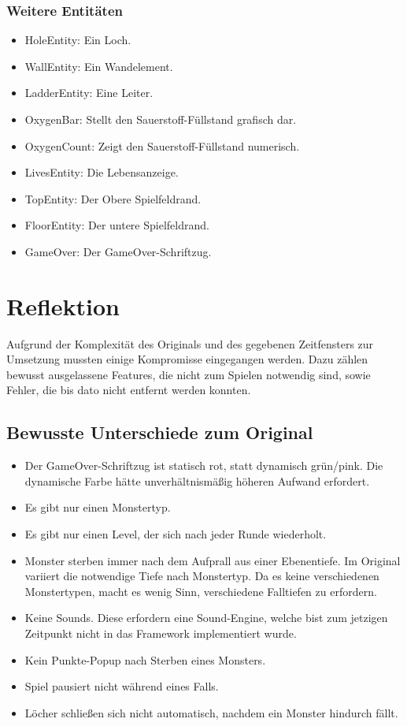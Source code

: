 \documentclass[12pt]{article}
\begin{document}
\subsubsection{Weitere Entitäten}\label{sssec:weitere}
\begin{itemize}
		\item HoleEntity: Ein Loch.
		\item WallEntity: Ein Wandelement.
		\item LadderEntity: Eine Leiter.
		\item OxygenBar: Stellt den Sauerstoff-Füllstand grafisch dar.
		\item OxygenCount: Zeigt den Sauerstoff-Füllstand numerisch.
		\item LivesEntity: Die Lebensanzeige.
		\item TopEntity: Der Obere Spielfeldrand.
		\item FloorEntity: Der untere Spielfeldrand.
		\item GameOver: Der GameOver-Schriftzug.
\end{itemize}



\section{Reflektion}
Aufgrund der Komplexität des Originals und des gegebenen Zeitfensters zur Umsetzung mussten einige Kompromisse eingegangen werden. Dazu zählen bewusst ausgelassene Features, die nicht zum Spielen notwendig sind, sowie Fehler, die bis dato nicht entfernt werden konnten.

\subsection{Bewusste Unterschiede zum Original}
	\begin{itemize}
		\item Der GameOver-Schriftzug ist statisch rot, statt dynamisch grün/pink. Die dynamische Farbe hätte unverhältnismäßig höheren Aufwand erfordert.
		\item Es gibt nur einen Monstertyp.
		\item Es gibt nur einen Level, der sich nach jeder Runde wiederholt.
		\item Monster sterben immer nach dem Aufprall aus einer Ebenentiefe. Im Original variiert die notwendige Tiefe nach Monstertyp. Da es keine verschiedenen Monstertypen, macht es wenig Sinn, verschiedene Falltiefen zu erfordern.
		\item Keine Sounds. Diese erfordern eine Sound-Engine, welche bist zum jetzigen Zeitpunkt nicht in das Framework implementiert wurde.
		\item Kein Punkte-Popup nach Sterben eines Monsters.
		\item Spiel pausiert nicht während eines Falls.
		\item Löcher schließen sich nicht automatisch, nachdem ein Monster hindurch fällt.
	\end{itemize}
\end{document}
